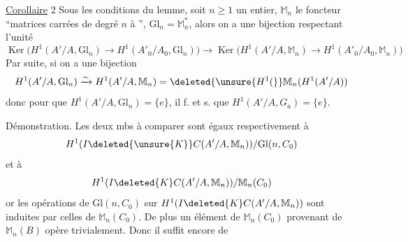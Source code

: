 \uline{Corollaire} 2 Sous les conditions du lemme, soit
$n\geq1$ un entier, $\mathbb M_n$ le foncteur ``matrices
carrées de degré $n$ à '', $\mathrm{Gl}_n=\mathbb M_n^*$, alors on
a une bijection respectant l'unité
\[
\operatorname{Ker}\big(H^1(A'/A,\mathrm{Gl}_n)\to H^1(A'_0/A_0,\mathrm{Gl}_n)\big)\to
\operatorname{Ker}\big(H^1(A'/A,\mathbb M_n)\to H^1(A'_0/A_0,\mathbb M_n)\big)
\]
Par suite, si 
on a une bijection
\[
H^1(A'/A,\mathrm{Gl}_n)\xrightarrow{\sim}H^1(A'/A,\mathbb M_n)=\deleted{\unsure{H^1(}}\mathbb M_n(H^1(A'/A))
\]
donc pour que $H^1(A'/A,\mathrm{Gl}_n)=\{e\}$, il f. et s. que
$H^1(A'/A,G_a)=\{e\}$.

Démonstration. Les deux mbs à comparer
sont égaux respectivement à
\[
H^1(I\deleted{\unsure{K}}C(A'/A,\mathbb M_n))/\mathrm{Gl}(n,C_0)
\]
et à
\[
H^1(I\deleted{K}C(A'/A,\mathbb M_n))/\mathbb M_n(C_0)
\]
or les opérations de $\mathrm{Gl}(n,C_0)$ sur $H^1(I\deleted{K}C(A'/A,\mathbb M_n))$
sont induites par celles de $\mathbb M_n(C_0)$. De plus
un élément de $\mathbb M_n(C_0)$ provenant de $\mathbb M_n(B)$ opère
trivialement. Donc il suffit encore de  
